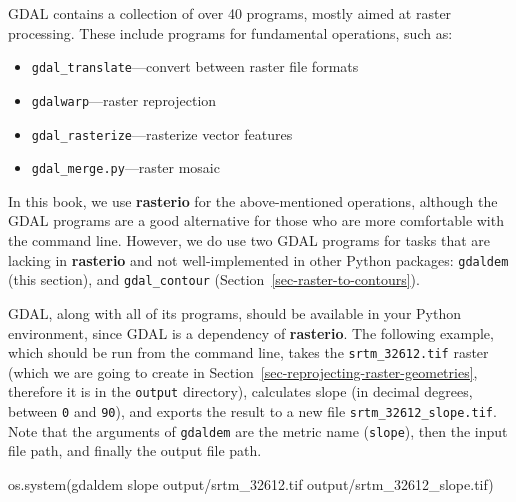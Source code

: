 \documentclass[
  letterpaper,
]{krantz}
\newenvironment{Shaded}{\begin{snugshade}}{\end{snugshade}}
\newcommand{\NormalTok}[1]{\textcolor[rgb]{0.00,0.23,0.31}{#1}}
\newcommand{\StringTok}[1]{\textcolor[rgb]{0.13,0.47,0.30}{#1}}
\providecommand{\tightlist}{%
  \setlength{\itemsep}{0pt}\setlength{\parskip}{0pt}}\usepackage{longtable,booktabs,array}
\begin{document}
\begin{tcolorbox}[enhanced jigsaw, breakable, title=\textcolor{quarto-callout-note-color}{\faInfo}\hspace{0.5em}{Note}, arc=.35mm, opacitybacktitle=0.6, left=2mm, colback=white, bottomrule=.15mm, bottomtitle=1mm, toptitle=1mm, colframe=quarto-callout-note-color-frame, leftrule=.75mm, rightrule=.15mm, toprule=.15mm, titlerule=0mm, opacityback=0, colbacktitle=quarto-callout-note-color!10!white, coltitle=black]

GDAL contains a collection of over 40 programs, mostly aimed at raster
processing. These include programs for fundamental operations, such as:

\begin{itemize}
\tightlist
\item
  \texttt{gdal\_translate}---convert between raster file formats
\item
  \texttt{gdalwarp}---raster reprojection
\item
  \texttt{gdal\_rasterize}---rasterize vector features
\item
  \texttt{gdal\_merge.py}---raster mosaic
\end{itemize}

In this book, we use \textbf{rasterio} for the above-mentioned
operations, although the GDAL programs are a good alternative for those
who are more comfortable with the command line. However, we do use two
GDAL programs for tasks that are lacking in \textbf{rasterio} and not
well-implemented in other Python packages: \texttt{gdaldem} (this
section), and \texttt{gdal\_contour}
(Section~\ref{sec-raster-to-contours}).

\end{tcolorbox}

GDAL, along with all of its programs, should be available in your Python
environment, since GDAL is a dependency of \textbf{rasterio}. The
following example, which should be run from the command line, takes the
\texttt{srtm\_32612.tif} raster (which we are going to create in
Section~\ref{sec-reprojecting-raster-geometries}, therefore it is in the
\texttt{\textquotesingle{}output\textquotesingle{}} directory),
calculates slope (in decimal degrees, between \texttt{0} and
\texttt{90}), and exports the result to a new file
\texttt{srtm\_32612\_slope.tif}. Note that the arguments of
\texttt{gdaldem} are the metric name (\texttt{slope}), then the input
file path, and finally the output file path.

\begin{Shaded}
\begin{Highlighting}[]
\NormalTok{os.system(}\StringTok{\textquotesingle{}gdaldem slope output/srtm\_32612.tif output/srtm\_32612\_slope.tif\textquotesingle{}}\NormalTok{)}
\end{Highlighting}
\end{Shaded}
\end{document}
